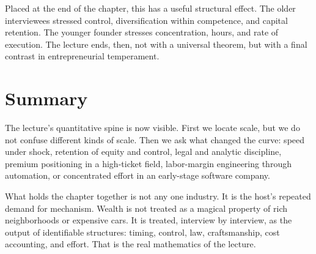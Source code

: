 Placed at the end of the chapter, this has a useful structural effect. The older interviewees stressed control, diversification within competence, and capital retention. The younger founder stresses concentration, hours, and rate of execution. The lecture ends, then, not with a universal theorem, but with a final contrast in entrepreneurial temperament.

\section{Summary}

The lecture's quantitative spine is now visible. First we locate scale, but we do not confuse different kinds of scale. Then we ask what changed the curve: speed under shock, retention of equity and control, legal and analytic discipline, premium positioning in a high-ticket field, labor-margin engineering through automation, or concentrated effort in an early-stage software company.

What holds the chapter together is not any one industry. It is the host's repeated demand for mechanism. Wealth is not treated as a magical property of rich neighborhoods or expensive cars. It is treated, interview by interview, as the output of identifiable structures: timing, control, law, craftsmanship, cost accounting, and effort. That is the real mathematics of the lecture.